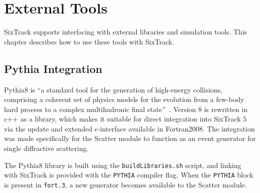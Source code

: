 
\chapter{External Tools} \label{ExtTools}

SixTrack supports interfacing with external libraries and simulation tools.
This chapter describes how to use these tools with SixTrack.

\section{Pythia Integration} \label{ExtPythia}

Pythia8 is ``a standard tool for the generation of high-energy collisions, comprising a coherent set of physics models for the evolution from a few-body hard process to a complex multihadronic final state''~\cite{pythia8}.
Version 8 is rewritten in c++ as a library, which makes it suitable for direct integration into SixTrack 5 via the update and extended c-interface available in Fortran2008.
The integration was made specifically for the Scatter module to function as an event generator for single diffractive scattering.

The Pythia8 library is built using the \texttt{buildLibraries.sh} script, and linking with SixTrack is provided with the \texttt{PYTHIA} compiler flag.
When the \texttt{PYTHIA} block is present in \texttt{fort.3}, a new generator becomes available to the Scatter module.
